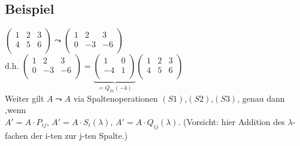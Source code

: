 \documentclass[a4paper, 12pt]{extarticle}
\begin{document}
\subsection*{Beispiel}
$\left(\begin{matrix} 
1 & 2 & 3 \\
4 & 5 & 6 \\
\end{matrix} \right) \leadsto
\left(\begin{matrix}
1 & 2 & 3 \\
0 & -3 & -6 \\
\end{matrix} \right) $\\
d.h. $
\left(\begin{matrix}
1 & 2 & 3 \\
0 & -3 & -6 \\
\end{matrix} \right) = 
\underbrace{\left(\begin{matrix}
1 & 0  \\
-4 & 1 \\
\end{matrix} \right)}_{=Q_{21}(-4)}
\left(\begin{matrix}
1 & 2 & 3 \\
4 & 5 & 6 \\
\end{matrix} \right)$\\
Weiter gilt $A \leadsto A$ via Spaltenoperationen $(S1)$,$(S2)$,$(S3)$, genau dann ,wenn\\
$A' = A \cdot P_{ij}$, $A' = A \cdot S_i(\lambda)$, $A' = A \cdot Q_{ij}(\lambda)$. (Vorsicht: hier Addition des $\lambda$-fachen der i-ten zur j-ten Spalte.) 
\end{document}
